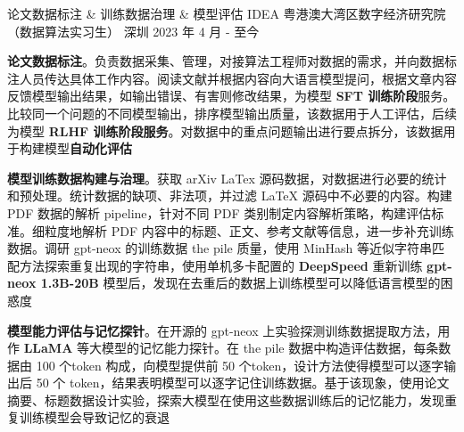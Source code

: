 

\begin{cventries}
\cventry
{论文数据标注 \& 训练数据治理 \& 模型评估} %
{IDEA 粤港澳大湾区数字经济研究院（数据算法实习生）} %
{深圳} %
{2023 年 4 月 - 至今} %
{
  \begin{cvitems}
    \item {\textbf{论文数据标注}。负责数据采集、管理，对接算法工程师对数据的需求，并向数据标注人员传达具体工作内容。阅读文献并根据内容向大语言模型提问，根据文章内容反馈模型输出结果，如输出错误、有害则修改结果，为模型 \textbf{SFT 训练阶段}服务。比较同一个问题的不同模型输出，排序模型输出质量，该数据用于人工评估，后续为模型 \textbf{RLHF 训练阶段服务}。对数据中的重点问题输出进行要点拆分，该数据用于构建模型\textbf{自动化评估}}
    \item {\textbf{模型训练数据构建与治理}。获取 arXiv LaTex 源码数据，对数据进行必要的统计和预处理。统计数据的缺项、非法项，并过滤 LaTeX 源码中不必要的内容。构建 PDF 数据的解析 pipeline，针对不同 PDF 类别制定内容解析策略，构建评估标准。细粒度地解析 PDF 内容中的标题、正文、参考文献等信息，进一步补充训练数据。调研 gpt-neox 的训练数据 the pile 质量，使用 MinHash 等近似字符串匹配方法探索重复出现的字符串，使用单机多卡配置的 \textbf{DeepSpeed} 重新训练 \textbf{gpt-neox 1.3B-20B} 模型后，发现在去重后的数据上训练模型可以降低语言模型的困惑度}
    \item {\textbf{模型能力评估与记忆探针}。在开源的 gpt-neox 上实验探测训练数据提取方法，用作 \textbf{LLaMA} 等大模型的记忆能力探针。在 the pile 数据中构造评估数据，每条数据由 100 个token 构成，向模型提供前 50 个token，设计方法使得模型可以逐字输出后 50 个 token，结果表明模型可以逐字记住训练数据。基于该现象，使用论文摘要、标题数据设计实验，探索大模型在使用这些数据训练后的记忆能力，发现重复训练模型会导致记忆的衰退}
  \end{cvitems}
}


\end{cventries}

